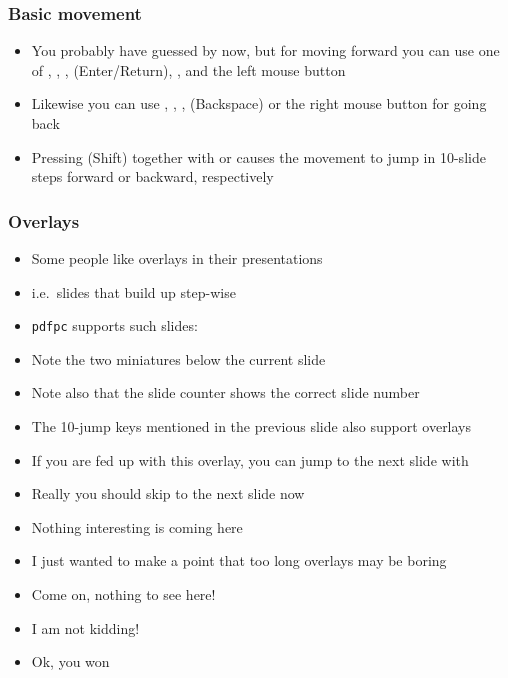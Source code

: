 \documentclass{beamer}
\newcommand{\pdfpc}{\texttt{pdfpc}\xspace}
\begin{document}
\begin{frame}
  \frametitle{Basic movement}
  \begin{itemize}
    \item You probably have guessed by now, but for moving forward you can use
      one of \keys{\arrowkeyright}, \keys{\arrowkeydown}, , \keys{\return} (Enter/Return), \keys{\SPACE}, and the left
      mouse button
    \item Likewise you can use \keys{\arrowkeyleft}, \keys{\arrowkeyup},
      , \keys{\backspace} (Backspace) or the right mouse
      button for going back
    \item Pressing \keys{\shift} (Shift) together with \keys{\arrowkeyright} or
      \keys{\arrowkeyleft} causes the movement to jump in 10-slide steps forward
      or backward, respectively
  \end{itemize}
\end{frame}

\begin{frame}
  \frametitle{Overlays}
  \begin{itemize}
    \item Some people like overlays in their presentations
    \pause
    \item i.e.\ slides that build up step-wise
    \pause
    \item \pdfpc supports such slides:
    \pause
    \item Note the two miniatures below the current slide
    \pause
    \item Note also that the slide counter shows the correct slide number
    \pause
    \item The 10-jump keys mentioned in the previous slide also support
      overlays
    \pause
    \item If you are fed up with this overlay, you can jump to the next slide
      with 
    \pause
    \item Really you should skip to the next slide now
    \pause
    \item Nothing interesting is coming here
    \pause
    \item I just wanted to make a point that too long overlays may be boring
    \pause
    \item Come on, nothing to see here!
    \pause
    \item I am not kidding!
    \pause
    \item Ok, you won
  \end{itemize}
\end{frame}
\end{document}
